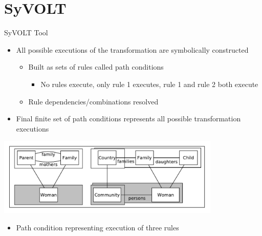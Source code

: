 \documentclass[12pt, handout]{beamer}
\begin{document}

\section{SyVOLT}

\begin{frame}{SyVOLT Tool}
\begin{itemize}[<+->]
\item All possible executions of the transformation are symbolically constructed
\begin{itemize}[<+->]
\item Built as sets of rules called path conditions
\begin{itemize}
\item No rules execute, only rule 1 executes, rule 1 and rule 2 both execute
\end{itemize}
\item Rule dependencies/combinations resolved

\end{itemize}
\item Final finite set of path conditions represents all possible transformation executions

\end{itemize}

\begin{center}
\includegraphics[width=0.8\textwidth]{figures/pc}
\end{center}

\begin{itemize}
\item Path condition representing execution of three rules
\end{itemize}
\end{frame}
\end{document}
